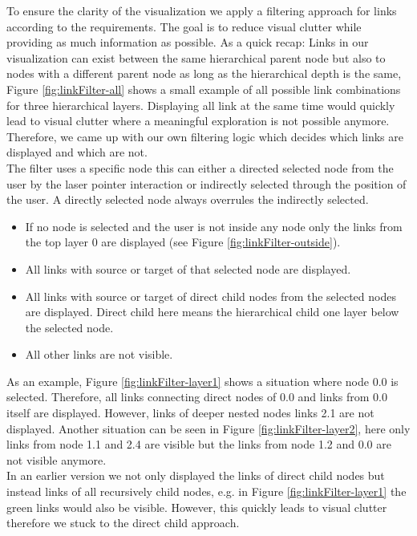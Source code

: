 To ensure the clarity of the visualization we apply a filtering approach for links according to the requirements. 
The goal is to reduce visual clutter while providing as much information as possible. 
As a quick recap: Links in our visualization can exist between the same hierarchical parent node but also to nodes with a different parent node as long as the hierarchical depth is the same, Figure \ref{fig:linkFilter-all} shows a small example of all possible link combinations for three hierarchical layers.
Displaying all link at the same time would quickly lead to visual clutter where a meaningful exploration is not possible anymore. 
Therefore, we came up with our own filtering logic which decides which links are displayed and which are not.\\ 
The filter uses a specific node this can either a directed selected node from the user by the laser pointer interaction or indirectly selected through the position of the user. A directly selected node always overrules the indirectly selected.

\begin{itemize}
    \item If no node is selected and the user is not inside any node only the links from the top layer 0 are displayed (see Figure \ref{fig:linkFilter-outside}).
    \item All links with source or target of that selected node are displayed. 
    \item All links with source or target of direct child nodes from the selected nodes are displayed. Direct child here means the hierarchical child one layer below the selected node. 
    \item All other links are not visible.
\end{itemize}

As an example, Figure \ref{fig:linkFilter-layer1} shows a situation where node 0.0 is selected. Therefore, all links connecting direct nodes of 0.0 and links from 0.0 itself are displayed. However, links of deeper nested nodes links 2.1 are not displayed. 
Another situation can be seen in Figure \ref{fig:linkFilter-layer2}, here only links from node 1.1 and 2.4 are visible but the links from node 1.2 and 0.0 are not visible anymore.\\
In an earlier version we not only displayed the links of direct child nodes but instead links of all recursively child nodes, e.g. in Figure \ref{fig:linkFilter-layer1} the green links would also be visible. However, this quickly leads to visual clutter therefore we stuck to the direct child approach.

